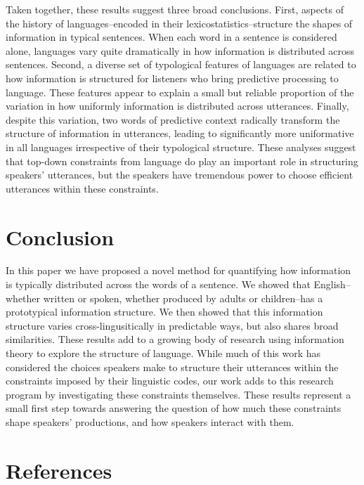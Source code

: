 \documentclass[10pt, letterpaper]{article}
\begin{document}
Taken together, these results suggest three broad conclusions. First,
aspects of the history of languages--encoded in their
lexicostatistics--structure the shapes of information in typical
sentences. When each word in a sentence is considered alone, languages
vary quite dramatically in how information is distributed across
sentences. Second, a diverse set of typological features of languages
are related to how information is structured for listeners who bring
predictive processing to language. These features appear to explain a
small but reliable proportion of the variation in how uniformly
information is distributed across utterances. Finally, despite this
variation, two words of predictive context radically transform the
structure of information in utterances, leading to significantly more
uniformative in all languages irrespective of their typological
structure. These analyses suggest that top-down constraints from
language do play an important role in structuring speakers' utterances,
but the speakers have tremendous power to choose efficient utterances
within these constraints.

\hypertarget{conclusion}{%
\section{Conclusion}\label{conclusion}}

In this paper we have proposed a novel method for quantifying how
information is typically distributed across the words of a sentence. We
showed that English--whether written or spoken, whether produced by
adults or children--has a prototypical information structure. We then
showed that this information structure varies cross-lingusitically in
predictable ways, but also shares broad similarities. These results add
to a growing body of research using information theory to explore the
structure of language. While much of this work has considered the
choices speakers make to structure their utterances within the
constraints imposed by their linguistic codes, our work adds to this
research program by investigating these constraints themselves. These
results represent a small first step towards answering the question of
how much these constraints shape speakers' productions, and how speakers
interact with them.

\hypertarget{references}{%
\section{References}\label{references}}
\end{document}
